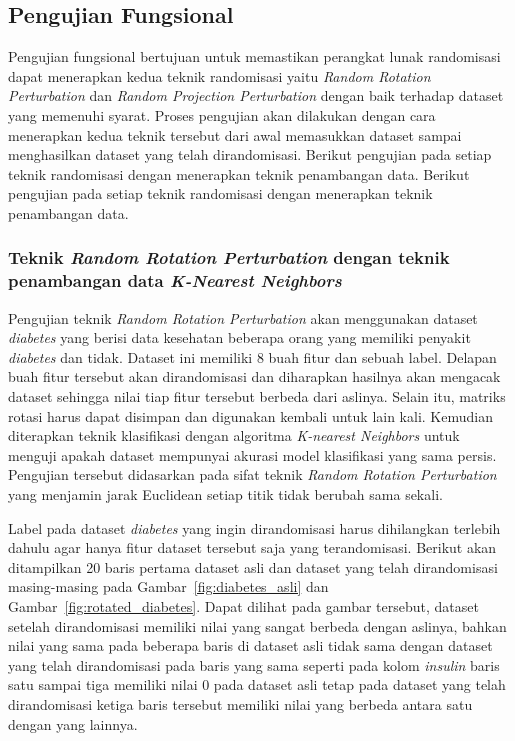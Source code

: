 \subsection{Pengujian Fungsional}
\label{sec:pengujianfungsional}

Pengujian fungsional bertujuan untuk memastikan perangkat lunak randomisasi dapat menerapkan kedua teknik randomisasi yaitu \textit{Random Rotation Perturbation} dan \textit{Random Projection Perturbation} dengan baik terhadap dataset yang memenuhi syarat. Proses pengujian akan dilakukan dengan cara menerapkan kedua teknik tersebut dari awal memasukkan dataset sampai menghasilkan dataset yang telah dirandomisasi. Berikut pengujian pada setiap teknik randomisasi dengan menerapkan teknik penambangan data. Berikut pengujian pada setiap teknik randomisasi dengan menerapkan teknik penambangan data.

\subsubsection{Teknik \textit{Random Rotation Perturbation} dengan teknik penambangan data \textit{K-Nearest Neighbors}}
\label{sec:rrp-knn}

Pengujian teknik \textit{Random Rotation Perturbation} akan menggunakan dataset \textit{diabetes} yang berisi data kesehatan beberapa orang yang memiliki penyakit \textit{diabetes} dan tidak. Dataset ini memiliki 8 buah fitur dan sebuah label. Delapan buah fitur tersebut akan dirandomisasi dan diharapkan hasilnya akan mengacak dataset sehingga nilai tiap fitur tersebut berbeda dari aslinya. Selain itu, matriks rotasi harus dapat disimpan dan digunakan kembali untuk lain kali. Kemudian diterapkan teknik klasifikasi dengan algoritma \textit{K-nearest Neighbors} untuk menguji apakah dataset mempunyai akurasi model klasifikasi yang sama persis. Pengujian tersebut didasarkan pada sifat teknik \textit{Random Rotation Perturbation} yang menjamin jarak Euclidean setiap titik tidak berubah sama sekali.

Label pada dataset \textit{diabetes} yang ingin dirandomisasi harus dihilangkan terlebih dahulu agar hanya fitur dataset tersebut saja yang terandomisasi. Berikut akan ditampilkan 20 baris pertama dataset asli dan dataset yang telah dirandomisasi masing-masing pada Gambar~\ref{fig:diabetes_asli} dan Gambar~\ref{fig:rotated_diabetes}. Dapat dilihat pada gambar tersebut, dataset setelah dirandomisasi memiliki nilai yang sangat berbeda dengan aslinya, bahkan nilai yang sama pada beberapa baris di dataset asli tidak sama dengan dataset yang telah dirandomisasi pada baris yang sama seperti pada kolom \textit{insulin} baris satu sampai tiga memiliki nilai 0 pada dataset asli tetap pada dataset yang telah dirandomisasi ketiga baris tersebut memiliki nilai yang berbeda antara satu dengan yang lainnya.

